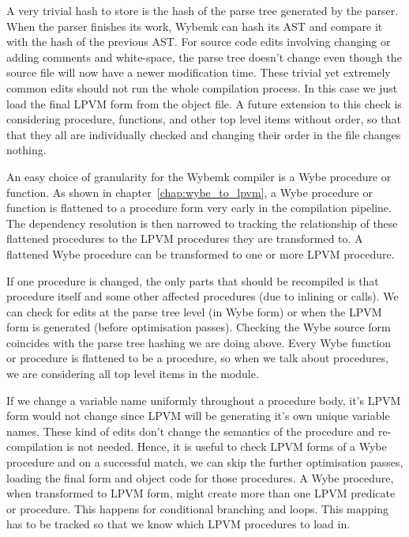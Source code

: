 A very trivial hash to store is the hash of the parse tree generated by the
parser. When the parser finishes its work, Wybemk can hash its AST and compare
it with the hash of the previous AST. For source code edits involving changing
or adding comments and white-space, the parse tree doesn't change even though
the source file will now have a newer modification time. These trivial yet
extremely common edits should not run the whole compilation process. In this
case we just load the final LPVM form from the object file. A future extension
to this check is considering procedure, functions, and other top level items
without order, so that that they all are individually checked and changing
their order in the file changes nothing.


An easy choice of granularity for the Wybemk compiler is a Wybe procedure or
function. As shown in chapter~\ref{chap:wybe_to_lpvm}, a Wybe procedure or
function is flattened to a procedure form very early in the compilation
pipeline. The dependency resolution is then narrowed to tracking the
relationship of these flattened procedures to the LPVM procedures they are
transformed to. A flattened Wybe procedure can be transformed to one or more
LPVM procedure.

If one procedure is changed, the only parts that should be recompiled is that
procedure itself and some other affected procedures (due to inlining or
calls). We can check for edits at the parse tree level (in Wybe form) or when
the LPVM form is generated (before optimisation passes). Checking the Wybe
source form coincides with the parse tree hashing we are doing above. Every
Wybe function or procedure is flattened to be a procedure, so when we talk
about procedures, we are considering all top level items in the module.

If we change a variable name uniformly throughout a procedure body, it's LPVM
form would not change since LPVM will be generating it's own unique variable
names. These kind of edits don't change the semantics of the procedure and
re-compilation is not needed. Hence, it is useful to check LPVM forms of a Wybe
procedure and on a successful match, we can skip the further optimisation
passes, loading the final form and object code for those procedures. A Wybe
procedure, when transformed to LPVM form, might create more than one LPVM
predicate or procedure. This happens for conditional branching and loops. This
mapping has to be tracked so that we know which LPVM procedures to load in.

